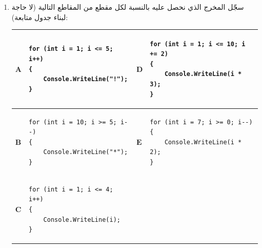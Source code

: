 \documentclass[14pt]{extarticle}
\begin{document}
\begin{enumerate}[resume, itemsep=1em]

\item سجّل المخرج الذي نحصل عليه بالنسبة لكل مقطع من المقاطع التالية (لا حاجة لبناء جدول متابعة):

{\centering
\renewcommand{\arraystretch}{1.3}
\begin{tabular}{|C{1cm}|p{6.2cm}|C{1cm}|p{6.2cm}|}
\hline
$\mathbf{A}$ &
\begin{pycell}
\begin{english}
\begin{verbatim}
for (int i = 1; i <= 5; i++)
{
    Console.WriteLine("!");
}
\end{verbatim}
\end{english}
\end{pycell}
& $\mathbf{D}$ &
\begin{pycell}
\begin{english}
\begin{verbatim}
for (int i = 1; i <= 10; i += 2)
{
    Console.WriteLine(i * 3);
}
\end{verbatim}
\end{english}
\end{pycell}
\\ \hline
$\mathbf{B}$ &
\begin{pycell}
\begin{english}
\begin{verbatim}
for (int i = 10; i >= 5; i--)
{
    Console.WriteLine("*");
}
\end{verbatim}
\end{english}
\end{pycell}
& $\mathbf{E}$ &
\begin{pycell}
\begin{english}
\begin{verbatim}
for (int i = 7; i >= 0; i--)
{
    Console.WriteLine(i * 2);
}
\end{verbatim}
\end{english}
\end{pycell}
\\ \hline
$\mathbf{C}$ &
\begin{pycell}
\begin{english}
\begin{verbatim}
for (int i = 1; i <= 4; i++)
{
    Console.WriteLine(i);
}
\end{verbatim}
\end{english}
\end{pycell}

\end{tabular}}
\end{enumerate}
\end{document}
